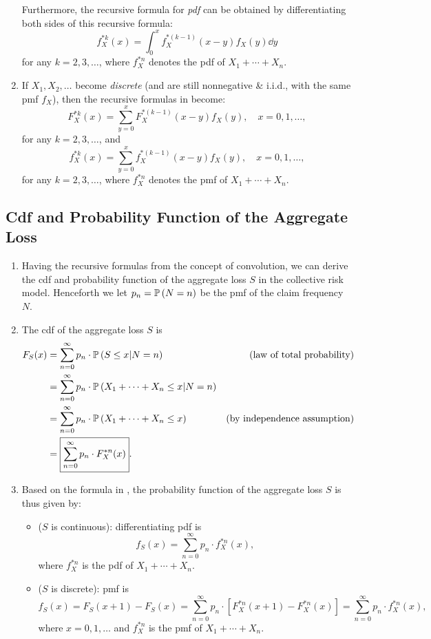 \begin{enumerate}
Furthermore, the recursive formula for \emph{pdf} can be obtained by
differentiating both sides of this recursive formula:
\[
f_{X}^{*k}(x)=\boxed{\int_{0}^{x}f_{X}^{*(k-1)}(x-y)f_X(y)\dd{y}}
\]
for any \(k=2,3,\dotsc\), where \(f_X^{*n}\) denotes the pdf of
\(X_1+\dotsb+X_n\).

\item \label{it:nonneg-disc-convolution-cdf-pdf-fmlas}
If \(X_1,X_2,\dotsc\) become \emph{discrete} (and are still nonnegative \&
i.i.d., with the same pmf \(f_X\)), then the recursive formulas in
 become:
\[
F_{X}^{*k}(x)=\boxed{\sum_{y=0}^{x}F_{X}^{*(k-1)}(x-y)f_X(y)},\quad x=0,1,\dotsc,
\]
for any \(k=2,3,\dotsc\), and
\[
f_{X}^{*k}(x)=\boxed{\sum_{y=0}^{x}f_{X}^{*(k-1)}(x-y)f_X(y)},\quad x=0,1,\dotsc,
\]
for any \(k=2,3,\dotsc\), where \(f_X^{*n}\) denotes the pmf of
\(X_1+\dotsb+X_n\).
\end{enumerate}
\subsection{Cdf and Probability Function of the Aggregate Loss}
\begin{enumerate}
\item Having the recursive formulas from the concept of convolution, we can
derive the cdf and probability function of the aggregate loss \(S\) in the
collective risk model. Henceforth we let \(p_n=\mathbb{P}\left(N=n\right)\) be the pmf of the
claim frequency \(N\).

\item \label{it:collective-risk-s-cdf}
The cdf of the aggregate loss \(S\) is
\begin{align*}
F_S(x)&=\sum_{n=0}^{\infty}p_n\cdot\mathbb{P}\left(S\le x|N=n\right) &\text{(law of total probability)}\\
&=\sum_{n=0}^{\infty}p_n\cdot\mathbb{P}\left(X_1+\dotsb+X_n\le x|N=n\right) \\
&=\sum_{n=0}^{\infty}p_n\cdot\mathbb{P}\left(X_1+\dotsb+X_n\le x\right) &\text{(by independence assumption)}\\
&=\boxed{\sum_{n=0}^{\infty}p_n\cdot F_{X}^{*n}(x)}.
\end{align*}

\item \label{it:collective-risk-s-probf}
Based on the formula in , the probability
function of the aggregate loss \(S\) is thus given by:
\begin{itemize}
\item (\(S\) is continuous): differentiating  pdf is
\[f_S(x)=\boxed{\sum_{n=0}^{\infty}p_n\cdot f_X^{*n}(x)},\] where
\(f_X^{*n}\) is the pdf of \(X_1+\dotsb+X_n\).
\item (\(S\) is discrete): pmf is
\[f_S(x)=F_S(x+1)-F_S(x)
=\sum_{n=0}^{\infty}p_n\cdot [F_{X}^{*n}(x+1)-F_{X}^{*n}(x)]
=\boxed{\sum_{n=0}^{\infty}p_n\cdot f_{X}^{*n}(x)},\]
where \(x=0,1,\dotsc\) and \(f_X^{*n}\) is the pmf of \(X_1+\dotsb+X_n\).
\end{itemize}
\end{enumerate}

